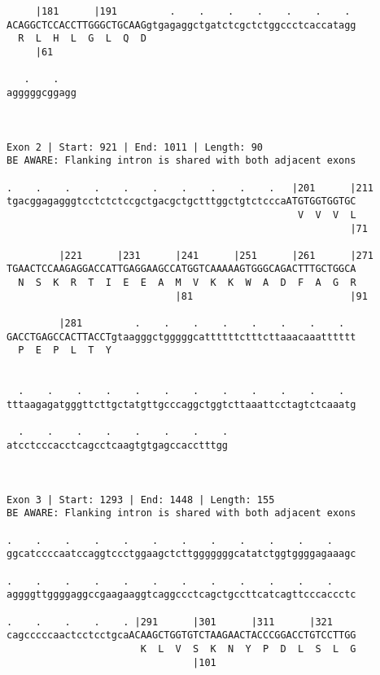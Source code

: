 \documentclass{article}
\begin{document}
\begin{Verbatim}
     |181      |191         .    .    .    .    .    .    . 
ACAGGCTCCACCTTGGGCTGCAAGgtgagaggctgatctcgctctggccctcaccatagg
  R  L  H  L  G  L  Q  D                                    
     |61                                                    
  
   .    .   
agggggcggagg
            
            
 
Exon 2 | Start: 921 | End: 1011 | Length: 90
BE AWARE: Flanking intron is shared with both adjacent exons
 
.    .    .    .    .    .    .    .    .    .   |201      |211
tgacggagagggtcctctctccgctgacgctgctttggctgtctcccaATGTGGTGGTGC
                                                  V  V  V  L
                                                           |71
  
         |221      |231      |241      |251      |261      |271
TGAACTCCAAGAGGACCATTGAGGAAGCCATGGTCAAAAAGTGGGCAGACTTTGCTGGCA
  N  S  K  R  T  I  E  E  A  M  V  K  K  W  A  D  F  A  G  R
                             |81                           |91
  
         |281         .    .    .    .    .    .    .    .  
GACCTGAGCCACTTACCTgtaagggctgggggcattttttctttcttaaacaaatttttt
  P  E  P  L  T  Y                                          
                                                            
  
  .    .    .    .    .    .    .    .    .    .    .    .  
tttaagagatgggttcttgctatgttgcccaggctggtcttaaattcctagtctcaaatg
                                                            
  .    .    .    .    .    .    .    .
atcctcccacctcagcctcaagtgtgagccacctttgg
                                      
                                      
 
Exon 3 | Start: 1293 | End: 1448 | Length: 155
BE AWARE: Flanking intron is shared with both adjacent exons
 
.    .    .    .    .    .    .    .    .    .    .    .    
ggcatccccaatccaggtccctggaagctcttgggggggcatatctggtggggagaaagc
                                                            
.    .    .    .    .    .    .    .    .    .    .    .    
aggggttggggaggccgaagaaggtcaggccctcagctgccttcatcagttcccaccctc
                                                            
.    .    .    .    . |291      |301      |311      |321    
cagcccccaactcctcctgcaACAAGCTGGTGTCTAAGAACTACCCGGACCTGTCCTTGG
                       K  L  V  S  K  N  Y  P  D  L  S  L  G
                                |101                        
  

\end{Verbatim}
\end{document}
